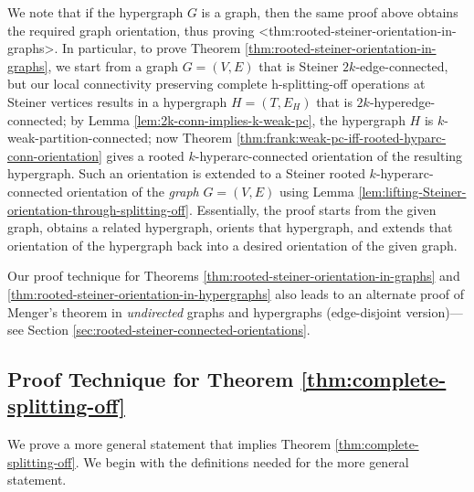 \documentclass{article}
\def\Cref#1{<#1>}%
\providecommand{\Z}{\mathbb{Z}}
\begin{document}
We note that if the hypergraph $G$ is a graph, then the same proof above obtains the required graph orientation, thus proving \Cref{thm:rooted-steiner-orientation-in-graphs}.
In particular, to prove Theorem \ref{thm:rooted-steiner-orientation-in-graphs}, we start from a graph $G=(V, E)$ that is Steiner $2k$-edge-connected, but our local connectivity preserving complete h-splitting-off operations at Steiner vertices results in a hypergraph $H=(T, E_H)$ that is $2k$-hyperedge-connected; by Lemma \ref{lem:2k-conn-implies-k-weak-pc}, the hypergraph $H$ is $k$-weak-partition-connected; now Theorem \ref{thm:frank:weak-pc-iff-rooted-hyparc-conn-orientation} gives a rooted $k$-hyperarc-connected orientation of the resulting hypergraph. Such an orientation is extended to a  Steiner rooted $k$-hyperarc-connected orientation of the \emph{graph} $G=(V, E)$ using Lemma \ref{lem:lifting-Steiner-orientation-through-splitting-off}. Essentially, the proof starts from the given graph, obtains a related hypergraph, orients that hypergraph, and extends that orientation of the hypergraph back into a desired orientation of the given graph. 

Our proof technique for Theorems \ref{thm:rooted-steiner-orientation-in-graphs} and \ref{thm:rooted-steiner-orientation-in-hypergraphs} also leads to an alternate proof of Menger's theorem in \emph{undirected} graphs and hypergraphs (edge-disjoint version)---see Section \ref{sec:rooted-steiner-connected-orientations}. 

\subsection{Proof Technique for Theorem \ref{thm:complete-splitting-off}}
We prove a more general statement that implies Theorem \ref{thm:complete-splitting-off}. We begin with the definitions needed for the more general statement. 
\end{document}
